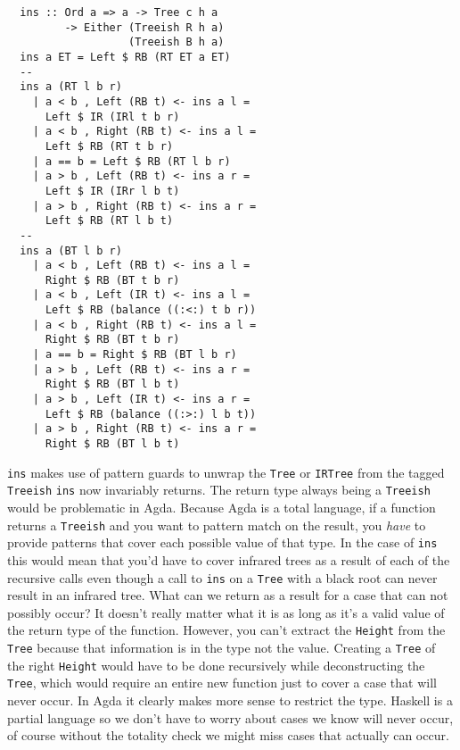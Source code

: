 \documentclass[journal, retainorgcmds]{IEEEtran}
\newcommand{\iagda}[1]{\texttt{#1}}
\newcommand{\ihask}[1]{\texttt{#1}}
\begin{document}
\begin{verbatim}
  ins :: Ord a => a -> Tree c h a
         -> Either (Treeish R h a)
                   (Treeish B h a)
  ins a ET = Left $ RB (RT ET a ET)
  --
  ins a (RT l b r)
    | a < b , Left (RB t) <- ins a l =
      Left $ IR (IRl t b r)
    | a < b , Right (RB t) <- ins a l =
      Left $ RB (RT t b r)
    | a == b = Left $ RB (RT l b r)
    | a > b , Left (RB t) <- ins a r =
      Left $ IR (IRr l b t)
    | a > b , Right (RB t) <- ins a r =
      Left $ RB (RT l b t)
  --
  ins a (BT l b r)
    | a < b , Left (RB t) <- ins a l =
      Right $ RB (BT t b r)
    | a < b , Left (IR t) <- ins a l =
      Left $ RB (balance ((:<:) t b r))
    | a < b , Right (RB t) <- ins a l =
      Right $ RB (BT t b r)
    | a == b = Right $ RB (BT l b r)
    | a > b , Left (RB t) <- ins a r =
      Right $ RB (BT l b t)
    | a > b , Left (IR t) <- ins a r =
      Left $ RB (balance ((:>:) l b t))
    | a > b , Right (RB t) <- ins a r =
      Right $ RB (BT l b t)
\end{verbatim}


\ihask{ins} makes use of pattern guards \cite{patguard} to unwrap the
\ihask{Tree} or \ihask{IRTree} from the tagged \ihask{Treeish} \ihask{ins} now
invariably returns.
The return type always being a \ihask{Treeish} would be problematic in Agda.
Because Agda is a total language, if a function returns a \iagda{Treeish} and
you want to pattern match on the result, you \emph{have} to provide patterns
that cover each possible value of that type.
In the case of \iagda{ins} this would mean that you'd have to cover infrared
trees as a result of each of the recursive calls even though a call to
\iagda{ins} on a \iagda{Tree} with a black root can never result in an infrared
tree.
What can we return as a result for a case that can not possibly occur?
It doesn't really matter what it is as long as it's a valid value of the return
type of the function.
However, you can't extract the \iagda{Height} from the \iagda{Tree} because
that information is in the type not the value.
Creating a \iagda{Tree} of the right \iagda{Height} would have to be done
recursively while deconstructing the \iagda{Tree}, which would require an
entire new function just to cover a case that will never occur.
In Agda it clearly makes more sense to restrict the type.
Haskell is a partial language so we don't have to worry about cases we know
will never occur, of course without the totality check we might miss cases that
actually can occur.
\end{document}
